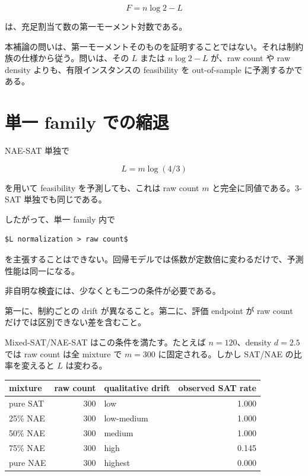 \documentclass[12pt,a4paper]{article}
\begin{document}
\[
F = n\log 2 - L
\]

は、充足割当て数の第一モーメント対数である。

本補論の問いは、第一モーメントそのものを証明することではない。それは制約族の仕様から従う。問いは、その \(L\) または \(n\log 2-L\) が、raw count や raw density よりも、有限インスタンスの feasibility を out-of-sample に予測するかである。

\section{単一 family での縮退}\label{ux5358ux4e00-family-ux3067ux306eux7e2eux9000}

NAE-SAT 単独で

\[
L=m\log(4/3)
\]

を用いて feasibility を予測しても、これは raw count \(m\) と完全に同値である。3-SAT 単独でも同じである。

したがって、単一 family 内で

\begin{verbatim}
$L normalization > raw count$
\end{verbatim}

を主張することはできない。回帰モデルでは係数が定数倍に変わるだけで、予測性能は同一になる。

非自明な検査には、少なくとも二つの条件が必要である。

第一に、制約ごとの drift が異なること。第二に、評価 endpoint が raw count だけでは区別できない差を含むこと。

Mixed-SAT/NAE-SAT はこの条件を満たす。たとえば \(n=120\)、density \(d=2.5\) では raw count は全 mixture で \(m=300\) に固定される。しかし SAT/NAE の比率を変えると \(L\) は変わる。

{\def\LTcaptype{table} %
\begin{longtable}[]{@{}lrlr@{}}
\toprule\noalign{}
mixture & raw count & qualitative drift & observed SAT rate \\
\midrule\noalign{}
\endhead
\bottomrule\noalign{}
\endlastfoot
pure SAT & 300 & low & 1.000 \\
25\% NAE & 300 & low-medium & 1.000 \\
50\% NAE & 300 & medium & 1.000 \\
75\% NAE & 300 & high & 0.145 \\
pure NAE & 300 & highest & 0.000 \\
\end{longtable}
}
\end{document}
